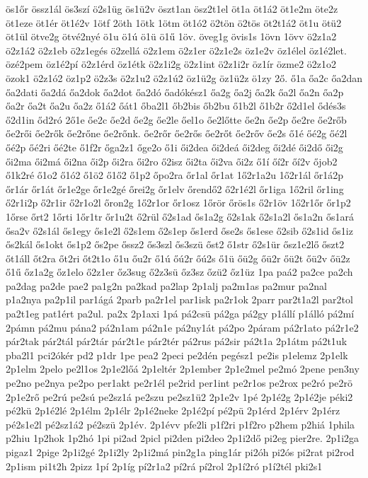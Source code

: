 {ös1őr
össz1ál
ös3szí
ö2s1üg
ös1ü2v
öszt1an
ösz2t1el
öt1a
öt1á2
öt1e2m
öte2z
öt1eze
öt1ér
öt1é2v
1ötf
2öth
1ötk
1ötm
öt1ó2
ö2tön
ö2tös
öt2t1á2
öt1u
ötü2
öt1ül
ötve2g
ötvé2nyé
ö1u
ö1ú
ö1ü
ö1ű
1öv.
öveg1g
övis1s
1övn
1övv
ö2z1a2
ö2z1á2
ö2z1eb
ö2z1egés
ö2zellá
ö2z1em
ö2z1er
ö2z1e2s
öz1e2v
öz1élel
öz1é2let.
özé2pem
öz1é2pí
ö2z1érd
öz1étk
ö2z1i2g
ö2z1int
ö2z1i2r
öz1ír
özme2
ö2z1o2
özok1
ö2z1ó2
öz1p2
ö2z3s
ö2z1u2
ö2z1ú2
öz1ü2g
öz1ü2z
ö1zy
2ő.
ő1a
őa2c
őa2dan
őa2dati
őa2dá
őa2dok
őa2dot
őa2dó
őadókész1
őa2g
őa2j
őa2k
őa2l
őa2n
őa2p
őa2r
őa2t
őa2u
őa2z
ő1á2
őát1
őba2l1
őb2bis
őb2bu
ő1b2l
ő1b2r
ő2d1el
ődés3s
ő2d1in
őd2ró
2ő1e
őe2c
őe2d
őe2g
őe2le
őel1o
őe2lőtte
őe2n
őe2p
őe2re
őe2rőb
őe2rői
őe2rők
őe2rőne
őe2rőnk.
őe2rőr
őe2rős
őe2rőt
őe2rőv
őe2s
ő1é
őé2g
őé2l
őé2p
őé2ri
őé2te
ő1f2r
őga2z1
őge2o
ő1i
ői2dea
ői2deá
ői2deg
ői2dé
ői2dő
ői2g
ői2ma
ői2má
ői2na
ői2p
ői2ra
ői2ro
ő2isz
ői2ta
ői2va
ői2z
ő1í
őí2r
őí2v
őjob2
ő1k2ré
ő1o2
ő1ó2
ő1ö2
ő1ő2
ő1p2
őpo2ra
őr1al
őr1at
1ő2r1a2u
1ő2r1ál
őr1á2p
őr1ár
őr1át
őr1e2ge
őr1e2gé
őrei2g
őr1elv
őrendő2
ő2r1é2l
őr1iga
1ő2ril
őr1ing
ő2r1i2p
ő2r1ir
ő2r1o2l
őron2g
1ő2r1or
őr1osz
1őrör
őrös1s
ő2r1öv
1ő2r1őr
őr1p2
1őrse
őrt2
1őrti
1őr1tr
őr1u2t
ő2rül
ő2s1ad
ős1a2g
ő2s1ak
ő2s1a2l
ős1a2n
ős1ará
ősa2v
ő2s1ál
ős1egy
ős1e2l
ő2s1em
ő2s1ep
ős1erd
őse2s
ős1ese
ő2sib
ő2s1id
ős1iz
ős2kál
ős1okt
ős1p2
ős2pe
őssz2
ős3szl
ős3szü
őst2
ő1str
ő2s1ür
ősz1e2lő
őszt2
őt1áll
őt2ra
őt2ri
őt2t1o
ő1u
őu2r
ő1ú
őú2r
őú2s
ő1ü
őü2g
őü2r
őü2t
őü2v
őü2z
ő1ű
őz1a2g
őz1elo
ő2z1er
őz3sug
ő2z3sü
őz3sz
őzü2
őz1üz
1pa
paá2
pa2ce
pa2ch
pa2dag
pa2de
pae2
pa1g2n
pa2kad
pa2lap
2p1alj
pa2m1as
pa2mur
pa2nal
p1a2nya
pa2p1il
par1ágá
2parb
pa2r1el
par1isk
pa2r1ok
2parr
par2t1a2l
par2tol
pa2t1eg
pat1ért
pa2ul.
pa2x
2p1axi
1pá
pá2csü
pá2ga
pá2gy
p1állí
p1álló
pá2mí
2pámn
pá2mu
pána2
pá2n1am
pá2n1e
pá2ny1át
pá2po
2páram
pá2r1ato
pá2r1e2
pár2tak
pár2tál
pár2tár
pár2t1e
pár2tér
pá2rus
pá2sir
pá2t1a
2p1átm
pá2t1uk
pba2l1
pci2ókér
pd2
p1dr
1pe
pea2
2peci
pe2dén
pegész1
pe2is
p1elemz
2p1elk
2p1elm
2pelo
pe2l1os
2p1e2lőá
2p1eltér
2p1ember
2p1e2mel
pe2mó
2pene
pen3ny
pe2no
pe2nya
pe2po
per1akt
pe2r1él
pe2rid
per1int
pe2r1os
pe2rox
pe2ró
pe2rö
2p1e2rő
pe2rú
pe2sú
pe2sz1á
pe2szu
pe2sz1ü2
2p1e2v
1pé
2p1é2g
2p1é2je
péki2
pé2kü
2p1é2lé
2p1élm
2p1élr
2p1é2neke
2p1é2pí
pé2pü
2p1érd
2p1érv
2p1érz
pé2s1e2l
pé2sz1á2
pé2szü
2p1év.
2p1évv
pfe2li
p1f2ri
p1f2ro
p2hem
p2hiá
1phila
p2hiu
1p2hok
1p2hó
1pi
pi2ad
2picl
pi2den
pi2deo
2p1i2dő
pi2eg
pier2re.
2p1i2ga
pigaz1
2pige
2p1i2gé
2p1i2ly
2p1i2má
pin2g1a
ping1ár
pi2óh
pi2ós
pi2rat
pi2rod
2p1ism
pi1t2h
2pizz
1pí
2p1íg
pí2r1a2
pí2rá
pí2rol
2p1í2ró
p1í2tél
pki2s1
}
